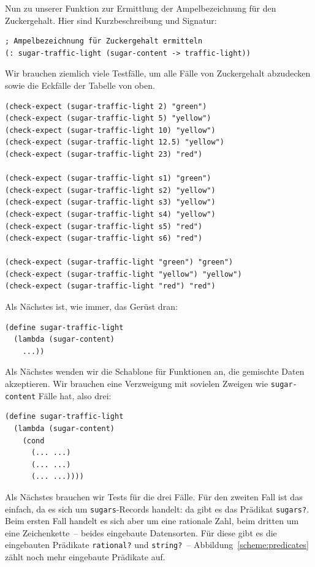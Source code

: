 Nun zu unserer Funktion zur Ermittlung der Ampelbezeichnung für den
Zuckergehalt.  Hier sind Kurzbeschreibung und Signatur:
%
\begin{lstlisting}
; Ampelbezeichnung für Zuckergehalt ermitteln
(: sugar-traffic-light (sugar-content -> traffic-light))
\end{lstlisting}
%
Wir brauchen ziemlich viele Testfälle, um alle Fälle von
Zuckergehalt abzudecken sowie die Eckfälle der Tabelle von oben.
%
\begin{lstlisting}
(check-expect (sugar-traffic-light 2) "green")
(check-expect (sugar-traffic-light 5) "yellow")
(check-expect (sugar-traffic-light 10) "yellow")
(check-expect (sugar-traffic-light 12.5) "yellow")
(check-expect (sugar-traffic-light 23) "red")

(check-expect (sugar-traffic-light s1) "green")
(check-expect (sugar-traffic-light s2) "yellow")
(check-expect (sugar-traffic-light s3) "yellow")
(check-expect (sugar-traffic-light s4) "yellow")
(check-expect (sugar-traffic-light s5) "red")
(check-expect (sugar-traffic-light s6) "red")

(check-expect (sugar-traffic-light "green") "green")
(check-expect (sugar-traffic-light "yellow") "yellow")
(check-expect (sugar-traffic-light "red") "red")
\end{lstlisting}
%
Als Nächstes ist, wie immer, das Gerüst dran:
%
\begin{lstlisting}
(define sugar-traffic-light
  (lambda (sugar-content)
    ...))
\end{lstlisting}         
%
Als Nächstes wenden wir die Schablone für Funktionen an, die gemischte
Daten akzeptieren.  Wir brauchen eine Verzweigung mit sovielen Zweigen
wie \lstinline{sugar-content} Fälle hat, also drei:
%
\begin{lstlisting}
(define sugar-traffic-light
  (lambda (sugar-content)
    (cond
      (... ...)
      (... ...)
      (... ...))))
\end{lstlisting}         
%
Als Nächstes brauchen wir Tests für die drei Fälle.  Für den zweiten
Fall ist das einfach, da es sich um \lstinline{sugars}-Records handelt:
da gibt es das Prädikat \lstinline{sugars?}.  Beim ersten Fall handelt es
sich aber um eine rationale Zahl, beim dritten um eine Zeichenkette~--
beides eingebaute Datensorten.  Für diese gibt es die eingebauten
Prädikate \lstinline{rational?} und \lstinline{string?}~--
Abbildung~\ref{scheme:predicates} zählt noch mehr eingebaute
Prädikate auf.
%
